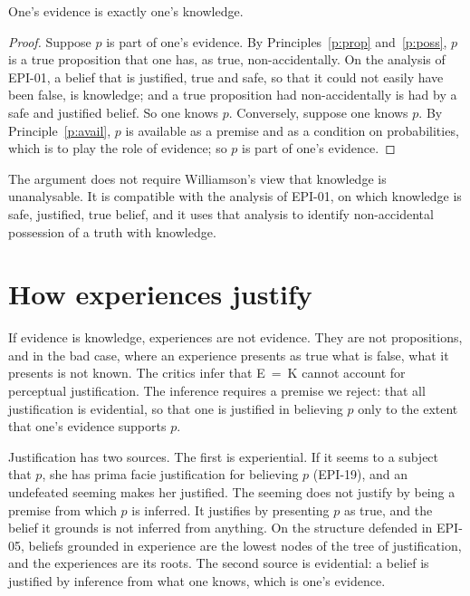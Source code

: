 \documentclass{situationist-preprint}
\begin{document}
\begin{theorem}[E = K]\label{t:ek}
One's evidence is exactly one's knowledge.
\end{theorem}

\begin{proof}
Suppose $p$ is part of one's evidence. By Principles~\ref{p:prop} and~\ref{p:poss}, $p$ is a true proposition that one has, as true, non-accidentally. On the analysis of EPI-01, a belief that is justified, true and safe, so that it could not easily have been false, is knowledge; and a true proposition had non-accidentally is had by a safe and justified belief. So one knows $p$. Conversely, suppose one knows $p$. By Principle~\ref{p:avail}, $p$ is available as a premise and as a condition on probabilities, which is to play the role of evidence; so $p$ is part of one's evidence.
\end{proof}

The argument does not require Williamson's view that knowledge is unanalysable. It is compatible with the analysis of EPI-01, on which knowledge is safe, justified, true belief, and it uses that analysis to identify non-accidental possession of a truth with knowledge.

\section{How experiences justify}

If evidence is knowledge, experiences are not evidence. They are not propositions, and in the bad case, where an experience presents as true what is false, what it presents is not known. The critics infer that E~=~K cannot account for perceptual justification. The inference requires a premise we reject: that all justification is evidential, so that one is justified in believing $p$ only to the extent that one's evidence supports $p$.

Justification has two sources. The first is experiential. If it seems to a subject that $p$, she has prima facie justification for believing $p$ (EPI-19), and an undefeated seeming makes her justified. The seeming does not justify by being a premise from which $p$ is inferred. It justifies by presenting $p$ as true, and the belief it grounds is not inferred from anything. On the structure defended in EPI-05, beliefs grounded in experience are the lowest nodes of the tree of justification, and the experiences are its roots. The second source is evidential: a belief is justified by inference from what one knows, which is one's evidence.
\end{document}
